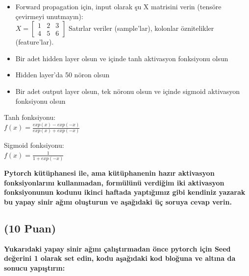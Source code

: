 \documentclass[11pt]{article}
\begin{document}
\begin{itemize}
    \item Forward propagation için, input olarak şu X matrisini verin (tensöre çevirmeyi unutmayın):\\
    $X = \begin{bmatrix}
        1 & 2 & 3\\
        4 & 5 & 6
        \end{bmatrix}$
    Satırlar veriler (sample'lar), kolonlar öznitelikler (feature'lar).
    \item Bir adet hidden layer olsun ve içinde tanh aktivasyon fonksiyonu olsun
    \item Hidden layer'da 50 nöron olsun
    \item Bir adet output layer olsun, tek nöronu olsun ve içinde sigmoid aktivasyon fonksiyonu olsun
\end{itemize}

Tanh fonksiyonu:\\
$f(x) = \frac{exp(x) - exp(-x)}{exp(x) + exp(-x)}$
\vspace{.2in}

Sigmoid fonksiyonu:\\
$f(x) = \frac{1}{1 + exp(-x)}$

\vspace{.2in}
 \textbf{Pytorch kütüphanesi ile, ama kütüphanenin hazır aktivasyon fonksiyonlarını kullanmadan, formülünü verdiğim iki aktivasyon fonksiyonunun kodunu ikinci haftada yaptığımız gibi kendiniz yazarak bu yapay sinir ağını oluşturun ve aşağıdaki üç soruya cevap verin.}
 
\subsection{(10 Puan)} \textbf{Yukarıdaki yapay sinir ağını çalıştırmadan önce pytorch için Seed değerini 1 olarak set edin, kodu aşağıdaki kod bloğuna ve altına da sonucu yapıştırın:}
\end{document}
